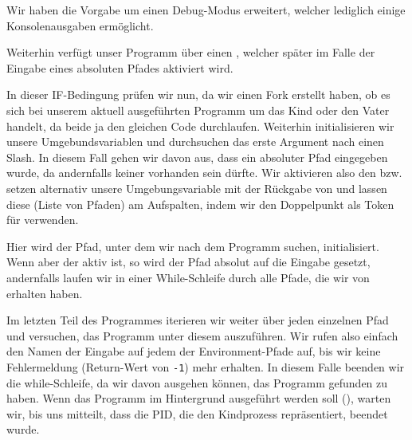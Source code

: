 
Wir haben die Vorgabe um einen Debug-Modus erweitert, welcher lediglich einige Konsolenausgaben ermöglicht.


Weiterhin verfügt unser Programm über einen , welcher später im Falle der Eingabe eines absoluten Pfades aktiviert wird. \clearpage


In dieser IF-Bedingung prüfen wir nun, da wir einen Fork erstellt haben, ob es sich bei unserem aktuell ausgeführten Programm um das Kind oder den Vater handelt, da beide ja den gleichen Code durchlaufen.
Weiterhin initialisieren wir unsere Umgebundsvariablen und durchsuchen das erste Argument nach einen Slash.
In diesem Fall gehen wir davon aus, dass ein absoluter Pfad eingegeben wurde, da andernfalls keiner vorhanden sein dürfte.
Wir aktivieren also den  bzw. setzen alternativ unsere Umgebungsvariable mit der Rückgabe von   und lassen diese (Liste von Pfaden) am Aufspalten, indem wir den Doppelpunkt als Token für  verwenden.


Hier wird der Pfad, unter dem wir nach dem Programm suchen, initialisiert.
Wenn aber der  aktiv ist, so wird der Pfad absolut auf die Eingabe gesetzt, andernfalls laufen wir in einer While-Schleife durch alle Pfade, die wir von  erhalten haben. \clearpage


Im letzten Teil des Programmes iterieren wir weiter über jeden einzelnen Pfad und versuchen, das Programm unter diesem auszuführen.
Wir rufen also einfach den Namen der Eingabe auf jedem der Environment-Pfade auf, bis wir keine Fehlermeldung (Return-Wert von \texttt{-1}) mehr erhalten.
In diesem Falle beenden wir die while-Schleife, da wir davon ausgehen können, das Programm gefunden zu haben.
Wenn das Programm im Hintergrund ausgeführt werden soll (), warten wir, bis uns  mitteilt, dass die PID, die den Kindprozess repräsentiert, beendet wurde.
